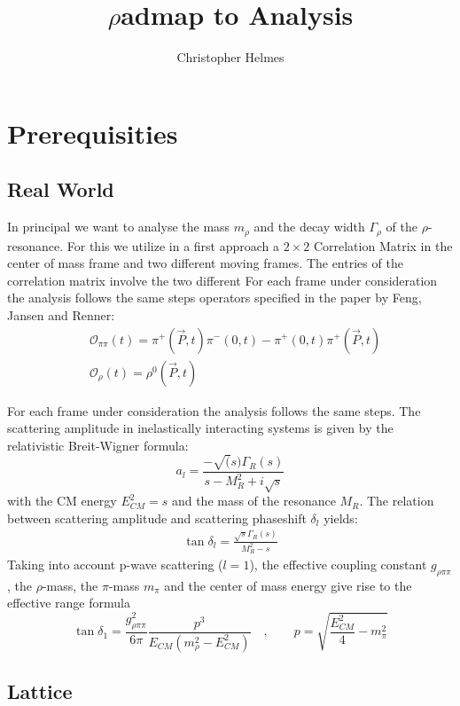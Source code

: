 \documentclass[12pt,a4paper]{scrartcl}
\title{$\rho$admap to Analysis}
\author{Christopher Helmes}
\begin{document}
\maketitle
\section{Prerequisities}
\subsection{Real World}
In principal we want to analyse the mass $m_{\rho}$ and the decay width
$\Gamma_{\rho}$ of the $\rho$-resonance. For this we utilize in a first approach
a $2\times 2$ Correlation Matrix in the center of mass frame and two different
moving frames. The entries of the correlation matrix involve the two different
For each frame under consideration the analysis follows the same steps
operators specified in the paper by Feng, Jansen and Renner: 
\begin{align}
  &\mathcal{O}_{\pi\pi}(t) =
  \pi^+(\vec{P},t)\pi^-(0,t)-\pi^+(0,t)\pi^+(\vec{P},t) \\
  &\mathcal{O}_{\rho}(t) = \rho^0(\vec{P},t)
\end{align}

For each frame under consideration the analysis follows the same steps. The
scattering amplitude in inelastically interacting systems is given by the
relativistic Breit-Wigner formula:
\begin{displaymath}
  a_l = \frac{-\sqrt(s)\Gamma_R(s)}{s-M_R^2+i\sqrt{s}} 
\end{displaymath}
with the CM energy $E_{CM}^2 = s$ and the mass of the resonance $M_R$. The
relation between scattering amplitude and scattering phaseshift $\delta_l$
yields:
\begin{align}
  \tan \delta_l = \frac{\sqrt{s}\Gamma_R(s)}{M_R^2-s}
\end{align}
Taking into account p-wave scattering ($l=1$), the effective coupling
constant $g_{\rho\pi\pi}$, the $\rho$-mass, the $\pi$-mass $m_{\pi}$ and the
center of mass energy give rise to the effective range formula
\begin{displaymath}
  \tan \delta_1 = \frac{g^2_{\rho\pi\pi}}{6\pi}
  \frac{p^3}{E_{CM}(m^2_{\rho}-E^2_{CM})} \quad, \qquad p =
  \sqrt{\frac{E^2_{CM}}{4}-m^2_{\pi}}
\end{displaymath}

\subsection{Lattice}
\end{document}
